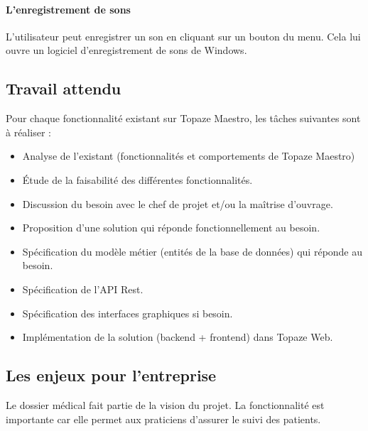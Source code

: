 \paragraph*{L'enregistrement de sons\\}
L'utilisateur peut enregistrer un son en cliquant sur un bouton du menu. Cela lui ouvre un logiciel d'enregistrement de sons de Windows.
 
\subsection{Travail attendu}

Pour chaque fonctionnalité existant sur Topaze Maestro, les tâches suivantes sont à réaliser :
\begin{itemize}
\item Analyse de l'existant (fonctionnalités et comportements de Topaze Maestro) 
\item Étude de la faisabilité des différentes fonctionnalités.
\item Discussion du besoin avec le chef de projet et/ou la maîtrise d'ouvrage.
\item Proposition d'une solution qui réponde fonctionnellement au besoin.
\item Spécification  du modèle métier (entités de la base de données) qui réponde au besoin.
\item Spécification de l'API Rest.
\item Spécification des interfaces graphiques si besoin.
\item Implémentation de la solution (backend + frontend) dans Topaze Web.
\end{itemize}

\subsection{Les enjeux pour l'entreprise}
Le dossier médical fait partie de la vision du projet. La fonctionnalité est importante car elle permet aux praticiens d'assurer le suivi des patients.